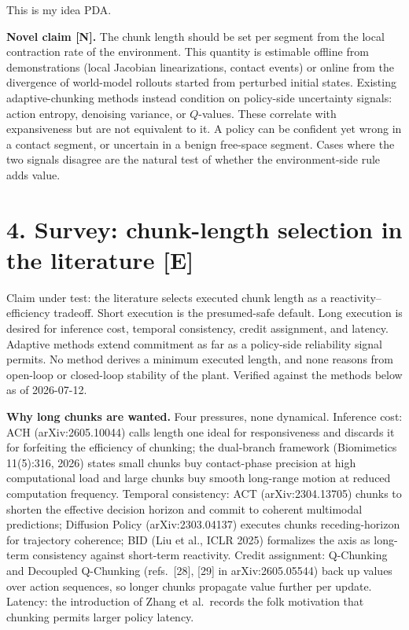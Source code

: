 This is my idea PDA. \documentclass[11pt]{article}
\begin{document}
\textbf{Novel claim [N].} The chunk length should be set per segment from the local contraction rate of the environment. This quantity is estimable offline from demonstrations (local Jacobian linearizations, contact events) or online from the divergence of world-model rollouts started from perturbed initial states. Existing adaptive-chunking methods instead condition on policy-side uncertainty signals: action entropy, denoising variance, or $Q$-values. These correlate with expansiveness but are not equivalent to it. A policy can be confident yet wrong in a contact segment, or uncertain in a benign free-space segment. Cases where the two signals disagree are the natural test of whether the environment-side rule adds value.

\newpage
\section*{4. Survey: chunk-length selection in the literature [E]}

Claim under test: the literature selects executed chunk length as a reactivity--efficiency tradeoff. Short execution is the presumed-safe default. Long execution is desired for inference cost, temporal consistency, credit assignment, and latency. Adaptive methods extend commitment as far as a policy-side reliability signal permits. No method derives a minimum executed length, and none reasons from open-loop or closed-loop stability of the plant. Verified against the methods below as of 2026-07-12.

\textbf{Why long chunks are wanted.} Four pressures, none dynamical. Inference cost: ACH (arXiv:2605.10044) calls length one ideal for responsiveness and discards it for forfeiting the efficiency of chunking; the dual-branch framework (Biomimetics 11(5):316, 2026) states small chunks buy contact-phase precision at high computational load and large chunks buy smooth long-range motion at reduced computation frequency. Temporal consistency: ACT (arXiv:2304.13705) chunks to shorten the effective decision horizon and commit to coherent multimodal predictions; Diffusion Policy (arXiv:2303.04137) executes chunks receding-horizon for trajectory coherence; BID (Liu et al., ICLR 2025) formalizes the axis as long-term consistency against short-term reactivity. Credit assignment: Q-Chunking and Decoupled Q-Chunking (refs.\ [28], [29] in arXiv:2605.05544) back up values over action sequences, so longer chunks propagate value further per update. Latency: the introduction of Zhang et al.\ records the folk motivation that chunking permits larger policy latency.
\end{document}
